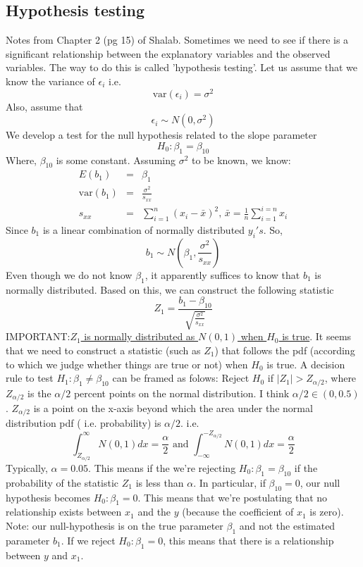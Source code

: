 \documentclass{article}
\newcommand{\beq}{\begin{equation}}
\newcommand{\eeq}{\end{equation}}
\newcommand{\ber}{\begin{eqnarray}}
\newcommand{\eer}{\end{eqnarray}}
\begin{document}
\subsection{Hypothesis testing}
Notes from Chapter 2 (pg 15) of Shalab. Sometimes we need to see if there is a significant relationship between the explanatory variables and the observed variables. The way to do this is called 'hypothesis testing'. Let us assume that we know the variance of $\epsilon_i$ i.e.
\beq
\text{var}(\epsilon_i) = \sigma^2
\eeq
Also, assume that
\beq
\epsilon_i \sim N(0,\sigma^2)
\eeq
We develop a test for the null hypothesis related to the slope parameter
\beq
H_0:\beta_1 = \beta_{10}
\eeq
Where, $\beta_{10}$ is some constant. Assuming $\sigma^2$ to be known, we know:
\ber
E(b_1)&=&\beta_1 \\
\text{var}(b_1) &=& \frac{\sigma^2}{s_{xx}}\\
s_{xx} &=& \sum_{i=1}^{n}(x_i - \bar{x})^2,\,\bar{x} = \frac{1}{n}\sum_{i=1}^{i=n}x_i
\eer
Since $b_1$ is a linear combination of normally distributed $y_i's$. So,
\beq
b_1 \sim N(\beta_1,\frac{\sigma^2}{s_{xx}})  
\eeq
Even though we do not know $\beta_1$, it apparently suffices to know that $b_1$ is normally distributed. Based on this, we can construct the following statistic
\beq
Z_1 = \frac{b_1-\beta_{10}}{\sqrt{\frac{\sigma^2}{s_{xx}}}}
\eeq
IMPORTANT:\underline{$Z_1$ is normally distributed as $N(0,1)$ when $H_0$ is true}. It seems that we need to construct a statistic (such as $Z_1$) that follows the pdf (according to which we judge whether things are true or not) when $H_0$ is true. A decision rule to test $H_1:\beta_1 \neq \beta_{10}$ can be framed as folows:
Reject $H_0$ if $|Z_1| > Z_{\alpha/2}$, where $Z_{\alpha/2}$ is the $\alpha/2$ percent points on the normal distribution. I think $\alpha/2 \in(0,0.5)$. $Z_{\alpha/2}$ is a point on the x-axis beyond which the area under the normal distribution pdf ( i.e. probability) is $\alpha/2$. i.e.
\beq
\int_{Z_{\alpha/2}}^{\infty}N(0,1)dx = \frac{\alpha}{2} \text{ and } \int_{-\infty}^{-Z_{\alpha/2}}N(0,1)dx = \frac{\alpha}{2}
\eeq
Typically, $\alpha = 0.05$. This means if the we're rejecting $H_0:\beta_1 = \beta_{10}$ if the probability of the statistic $Z_1$ is less than $\alpha$. In particular, if $\beta_{10}=0$, our null hypothesis becomes $H_0:\beta_1 = 0$. This means that we're postulating that no relationship exists between $x_1$ and the $y$ (because the coefficient of $x_1$ is zero). Note: our null-hypothesis is on the true parameter $\beta_1$ and not the estimated parameter $b_1$. If we reject  $H_0:\beta_1 = 0$, this means that there is a relationship between $y$ and $x_1$.
\end{document}
